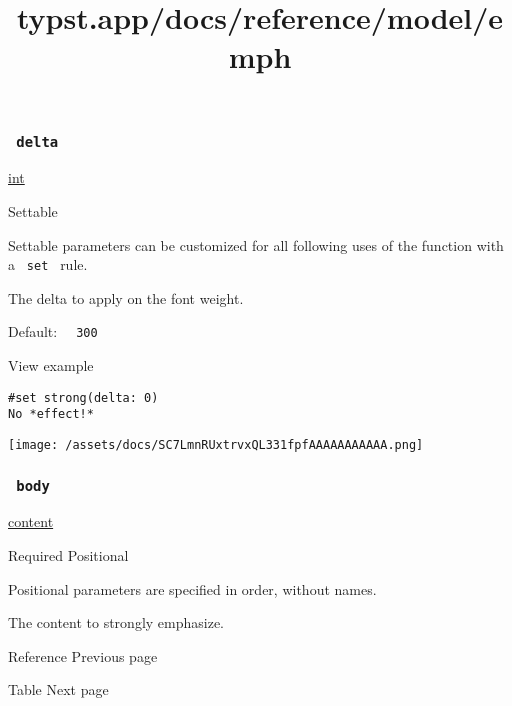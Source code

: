 \subsubsection{\texorpdfstring{\texttt{\ delta\ }}{ delta }}\label{parameters-delta}

\href{/docs/reference/foundations/int/}{int}

{{ Settable }}

\label{parameters-delta-settable-tooltip}
Settable parameters can be customized for all following uses of the
function with a \texttt{\ set\ } rule.

The delta to apply on the font weight.

Default: \texttt{\ }{\texttt{\ 300\ }}\texttt{\ }


View example

\begin{verbatim}
#set strong(delta: 0)
No *effect!*
\end{verbatim}

\texttt{[image: /assets/docs/SC7LmnRUxtrvxQL331fpfAAAAAAAAAAA.png]}

\subsubsection{\texorpdfstring{\texttt{\ body\ }}{ body }}\label{parameters-body}

\href{/docs/reference/foundations/content/}{content}

{Required} {{ Positional }}

\label{parameters-body-positional-tooltip}
Positional parameters are specified in order, without names.

The content to strongly emphasize.

\href{/docs/reference/model/ref/}{\pandocbounded{}}

{ Reference } { Previous page }

\href{/docs/reference/model/table/}{\pandocbounded{}}

{ Table } { Next page }


\title{typst.app/docs/reference/model/emph}

